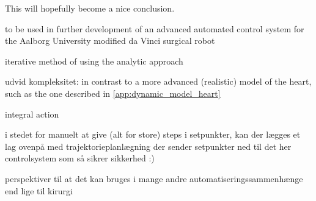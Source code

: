 This will hopefully become a nice conclusion.

to be used in further development of an advanced automated control system for the Aalborg University modified da Vinci surgical robot



iterative method of using the analytic approach

udvid kompleksitet:
in contrast to a more advanced (realistic) model of the heart, such as the one described in \autoref{app:dynamic_model_heart}

integral action

i stedet for manuelt at give (alt for store) steps i setpunkter, kan der lægges et lag ovenpå med trajektorieplanlægning der sender setpunkter ned til det her controlsystem som så sikrer sikkerhed :)

perspektiver til at det kan bruges i mange andre automatiseringssammenhænge end lige til kirurgi
